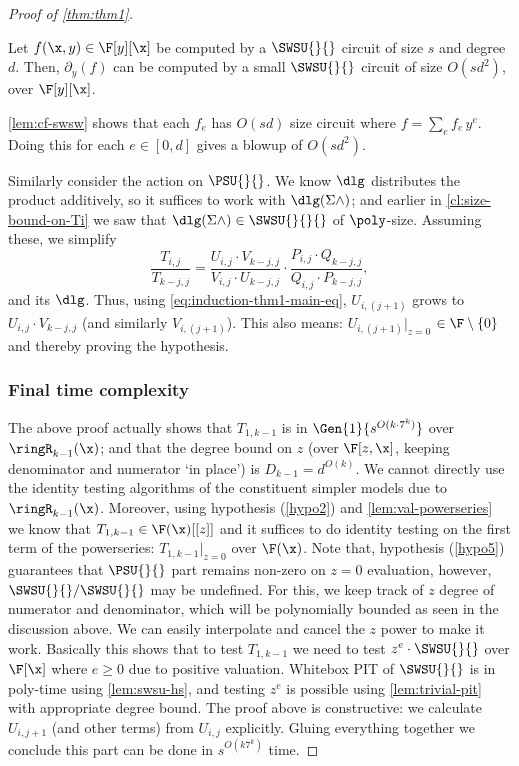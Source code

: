 \begin{proof}[Proof of \autoref{thm:thm1}]
\begin{lemma}[Differentiation] \label{lem:diff-size}
    Let $f(\x,y) \in \F[y][\x]$ be computed by a $\SWSU{}{}$ circuit of size $s$ and degree $d$. Then, $\partial_{y}(f)$ can be computed by a small $\SWSU{}{}$ circuit of size $O(sd^2)$, over $\F[y][\x]$.
\end{lemma}
\begin{proof-sketch}
    \autoref{lem:cf-swsw} shows that each $f_e$ has $O(sd)$ size circuit where $f=\sum_{e} f_e\,y^e$. 
    Doing this for each $e \in [0,d]$ gives a blowup of $O(sd^2)$.
\end{proof-sketch}

Similarly consider the action on $ \PSU{}{}$. We know $\dlg$ distributes the product additively, so it suffices to work with $\dlg(\Sigma \wedge)$; and earlier in \autoref{cl:size-bound-on-Ti} we saw that $\dlg(\Sigma \wedge) \in \SWSU{}{}{}$ of $\poly$-size. Assuming these, we simplify \[ \frac{T_{i,j}}{T_{k-j,j}} = \frac{U_{i,j} \cdot V_{k-j,j}}{V_{i,j} \cdot U_{k-j,j}} \cdot \frac{P_{i,j} \cdot Q_{k-j,j}}{Q_{i,j} \cdot P_{k-j,j}},\] and its $\dlg$. Thus, using \autoref{eq:induction-thm1-main-eq}, $U_{i,(j+1)}$ grows to $U_{i,j} \cdot V_{k-j,j}$ (and similarly $V_{i,(j+1)}$). This also means: $U_{i,(j+1)} \rvert_{z=0}$ $\in \F\setminus\{0\}$ and thereby proving the hypothesis.


\subsubsection*{Final time complexity} 
The above proof actually shows that $T_{1,k-1}$ is in $\Gen{1}{s^{O(k\cdot 7^k)}}$ over $\ringR_{k-1}(\x)$; and that the degree bound on $z$ (over $\F[z,\x]$, keeping denominator and numerator `in place') is $D_{k-1} = d^{O(k)}$. We cannot directly use the identity testing algorithms of the constituent simpler models due to $\ringR_{k-1}(\x)$. Moreover, using hypothesis (\ref{hypo2}) and \autoref{lem:val-powerseries} we know that $T_{1,k-1} \in \F(\x)[[z]]$ and it suffices to do identity testing on the first term of the powerseries: $T_{1,k-1} \rvert_{z = 0}$ over $\F(\x)$. Note that, hypothesis (\ref{hypo5}) guarantees that $\PSU{}{}$ part remains non-zero on $z = 0$ evaluation, however, $\SWSU{}{}/\SWSU{}{}$ may be undefined. For this, we keep track of $z$ degree of numerator and denominator, which will be polynomially bounded as seen in the discussion above. We can easily interpolate and cancel the $z$ power to make it work. Basically this shows that to test $T_{1,k-1}$ we need to test $z^e \cdot \SWSU{}{}$ over $\F[\x]$ where $e \geq 0$ due to positive valuation. Whitebox PIT of $\SWSU{}{}$ is in poly-time using \autoref{lem:swsu-hs}, and testing $z^e$ is possible using \autoref{lem:trivial-pit} with appropriate degree bound. The proof above is constructive: we calculate $U_{i,j+1}$ (and other terms) from $U_{i,j}$ explicitly. Gluing everything together we conclude this part can be done in $s^{O(k 7^k)}$ time.


\end{proof}
